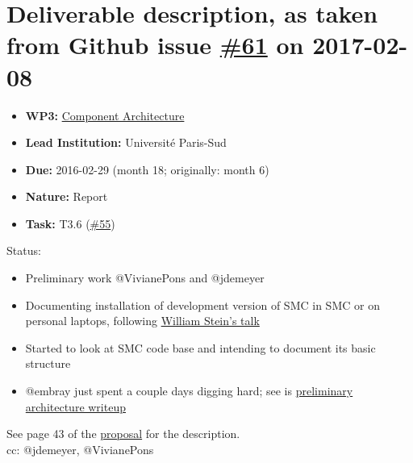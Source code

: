 \section*{\texorpdfstring{Deliverable description, as taken from Github
issue
\href{https://github.com/OpenDreamKit/OpenDreamKit/issues/61}{\#61} on
2017-02-08}{Deliverable description, as taken from Github issue \#61 on 2017-02-08}}\label{deliverable-description-as-taken-from-github-issue-61-on-2017-02-08}

\begin{itemize}
\tightlist
\item
  \textbf{WP3:}
  \href{https://github.com/OpenDreamKit/OpenDreamKit/tree/master/WP3}{Component
  Architecture}
\item
  \textbf{Lead Institution:} Université Paris-Sud
\item
  \textbf{Due:} 2016-02-29 (month 18; originally: month 6)
\item
  \textbf{Nature:} Report
\item
  \textbf{Task:} T3.6
  (\href{https://github.com/OpenDreamKit/OpenDreamKit/issues/55}{\#55})
\end{itemize}

Status:

\begin{itemize}
\tightlist
\item
  Preliminary work @VivianePons and @jdemeyer
\item
  Documenting installation of development version of SMC in SMC or on
  personal laptops, following
  \href{https://cloud.sagemath.com/ad9e7c84-b1de-4c64-b056-9a5e04d9107e/raw/wstein/talks/smc-dev/smc-dev.pdf}{William
  Stein's talk}
\item
  Started to look at SMC code base and intending to document its basic
  structure
\item
  @embray just spent a couple days digging hard; see is
  \href{https://gist.github.com/embray/cfeedba5d814d12e123710a8f43603fa\#file-overview-rst}{preliminary
  architecture writeup}
\end{itemize}

See page 43 of the
\href{https://github.com/OpenDreamKit/OpenDreamKit/raw/master/Proposal/proposal-www.pdf}{proposal}
for the description.\\
cc: @jdemeyer, @VivianePons
